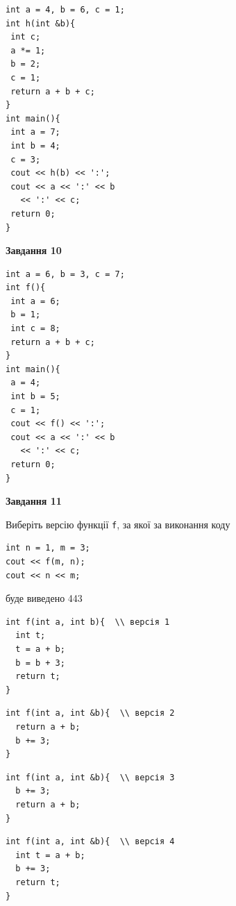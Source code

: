 \documentclass[12pt, ukrainian]{article}
\def\code#1{\Verb!#1!}
\begin{document}
{\begin {large}
\begin{minipage}[t]{7.0cm}
\begin{verbatim}
int a = 4, b = 6, c = 1;
int h(int &b){
 int c;
 a *= 1;
 b = 2;
 c = 1;
 return a + b + c;
}
int main(){
 int a = 7;
 int b = 4;
 c = 3;
 cout << h(b) << ':';
 cout << a << ':' << b 
   << ':' << c;
 return 0;
}
\end{verbatim}



\begin{center}
\textbf{Завдання 10}
\end{center}
\vspace{-8mm}

\begin{verbatim}
int a = 6, b = 3, c = 7;
int f(){
 int a = 6;
 b = 1;
 int c = 8;
 return a + b + c;
}
int main(){
 a = 4;
 int b = 5;
 c = 1;
 cout << f() << ':';
 cout << a << ':' << b 
   << ':' << c;
 return 0;
}
\end{verbatim}

\end{minipage}
\vline \hspace{1mm}
\begin{minipage}[t]{11.0cm}

\begin{center}
\textbf{Завдання 11}
\end{center}
Виберіть версію функції \code{f}, за якої за виконання коду
\begin{verbatim}
int n = 1, m = 3;
cout << f(m, n);
cout << n << m;
\end{verbatim}

буде виведено 443

\begin{verbatim}
int f(int a, int b){  \\ версія 1
  int t;
  t = a + b;
  b = b + 3;
  return t;
}
\end{verbatim}

\vspace{-8mm}\begin{verbatim}
int f(int a, int &b){  \\ версія 2
  return a + b;
  b += 3;
}
\end{verbatim}

\vspace{-8mm}\begin{verbatim}
int f(int a, int &b){  \\ версія 3
  b += 3;
  return a + b;
}
\end{verbatim}

\vspace{-8mm}\begin{verbatim}
int f(int a, int &b){  \\ версія 4
  int t = a + b;
  b += 3;
  return t;
}
\end{verbatim}




\end{minipage}
\end{large}}
\end{document}
